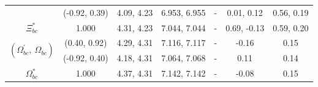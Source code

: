 \documentclass[prt,twocolumn,floatfix,nofootinbib]{revtex4}
\begin{document}
\begin{table}[!htbp]
\begin{tabular}{ccccccc}
                            &(-0.92, 0.39)      &4.09, 4.23	    &6.953, 6.955	    &-          &0.01, 0.12             &0.56, 0.19 \\
        $\Xi_{bc}^{\ast}$ 	&1.000              &4.31, 4.23	    &7.044, 7.044	    &-          &0.69, -0.13            &0.59, 0.20 \\
        \multirow{2}{*}{$\left(\Omega_{bc}^{\prime},\ \Omega_{bc}\right)$}
                            &(0.40, 0.92)       &4.29, 4.31	    &7.116, 7.117	    &-          &-0.16                  &0.15 \\
                            &(-0.92, 0.40)      &4.18, 4.31	    &7.064, 7.068	    &-          &0.11                   &0.14 \\
        $\Omega_{bc}^{\ast}$&1.000              &4.37, 4.31	    &7.142, 7.142	    &-          &-0.08                  &0.15 \\
        \hline\hline
    \end{tabular}
\end{table}
\end{document}
